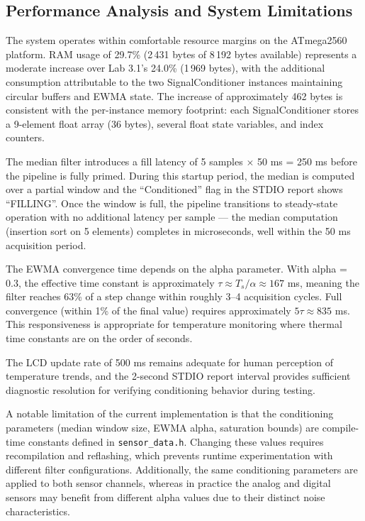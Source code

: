 \subsection{Performance Analysis and System Limitations}

The system operates within comfortable resource margins on the ATmega2560 platform. RAM usage of 29.7\% (2\,431 bytes of 8\,192 bytes available) represents a moderate increase over Lab 3.1's 24.0\% (1\,969 bytes), with the additional consumption attributable to the two SignalConditioner instances maintaining circular buffers and EWMA state. The increase of approximately 462 bytes is consistent with the per-instance memory footprint: each SignalConditioner stores a 9-element float array (36 bytes), several float state variables, and index counters.

The median filter introduces a fill latency of 5 samples $\times$ 50 ms = 250 ms before the pipeline is fully primed. During this startup period, the median is computed over a partial window and the ``Conditioned'' flag in the STDIO report shows ``FILLING''. Once the window is full, the pipeline transitions to steady-state operation with no additional latency per sample --- the median computation (insertion sort on 5 elements) completes in microseconds, well within the 50 ms acquisition period.

The EWMA convergence time depends on the alpha parameter. With alpha = 0.3, the effective time constant is approximately $\tau \approx T_s / \alpha \approx 167$ ms, meaning the filter reaches 63\% of a step change within roughly 3--4 acquisition cycles. Full convergence (within 1\% of the final value) requires approximately $5\tau \approx 835$ ms. This responsiveness is appropriate for temperature monitoring where thermal time constants are on the order of seconds.

The LCD update rate of 500 ms remains adequate for human perception of temperature trends, and the 2-second STDIO report interval provides sufficient diagnostic resolution for verifying conditioning behavior during testing.

A notable limitation of the current implementation is that the conditioning parameters (median window size, EWMA alpha, saturation bounds) are compile-time constants defined in \texttt{sensor\_data.h}. Changing these values requires recompilation and reflashing, which prevents runtime experimentation with different filter configurations. Additionally, the same conditioning parameters are applied to both sensor channels, whereas in practice the analog and digital sensors may benefit from different alpha values due to their distinct noise characteristics.

